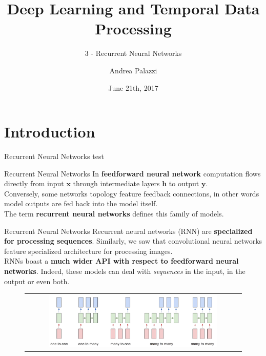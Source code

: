 \documentclass[aspectratio=169]{beamer}
\title[Deep Learning and Temporal Data Processing]{Deep Learning and Temporal Data Processing}
\subtitle{3 - Recurrent Neural Networks}
\institute{University of Modena and Reggio Emilia}
\author{Andrea Palazzi}
\date{June 21th, 2017}
\def\thisframelogos{}
\newcommand{\framelogo}[1]{\def\thisframelogos{#1}}
\begin{document}
\framelogo{logo_unimore_white.png}





\section{Introduction}


\begin{frame}{Recurrent Neural Networks}
test \cite{cybenko1989approximation}
\end{frame}


\begin{frame}{Recurrent Neural Networks}
In \textbf{feedforward neural network} computation flows directly from input $\bm{x}$ through intermediate layers $\bm{h}$ to output $\bm{y}$.\\
\vspace{0.5cm}
Conversely, some networks topology feature feedback connections, in other words model outputs are fed back into the model itself.\\
\vspace{0.5cm}
The term \textbf{recurrent neural networks} defines this family of models.

\end{frame}


\begin{frame}{Recurrent Neural Networks}
Recurrent neural networks (RNN) are \textbf{specialized for processing sequences}. Similarly, we saw that convolutional neural networks feature specialized architecture for processing images.\\
\vspace{0.4cm}
RNNs boast a \textbf{much wider API with respect to feedforward neural networks}. Indeed, these models can deal with \textit{sequences} in the input, in the output or even both.
\begin{figure}
\begin{tabular}{c}
\includegraphics[width=0.8\textwidth]{img/rnn/rnn_api.png}
\end{tabular}
\end{figure}
\end{frame}
\end{document}
